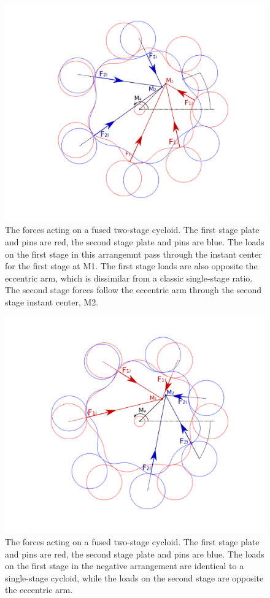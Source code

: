 \begin{figure}[h]
	\centering
	\includegraphics[width=0.80\linewidth]{fig/two_stage_loads_pos}
   \caption{The forces acting on a fused two-stage cycloid. The first stage plate and pins are red, the second stage plate and pins are blue. The loads on the first stage in this arrangemnt pass through the instant center for the first stage at M1. The first stage loads are also opposite the eccentric arm, which is dissimilar from a classic single-stage ratio. The second stage forces follow the eccentric arm through the second stage instant center, M2. }
   \label{fig:two_stage_force_pos}
\end{figure}

\begin{figure}[h]
	\centering
	\includegraphics[width=0.80\linewidth]{fig/two_stage_loads_neg}
   \caption{The forces acting on a fused two-stage cycloid. The first stage plate and pins are red, the second stage plate and pins are blue. The loads on the first stage in the negative arrangement are identical to a single-stage cycloid, while the loads on the second stage are opposite the eccentric arm.}
   \label{fig:two_stage_force_neg}
\end{figure}

